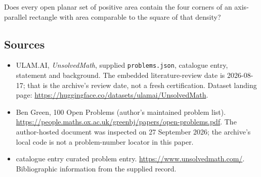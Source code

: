 \documentclass[11pt,a4paper]{article}
\begin{document}
Does every open planar set of positive area contain the four corners of an axis-parallel rectangle with area comparable to the square of that density?

\subsection{Sources}

{\small

\begin{itemize}

\item[\hypertarget{source:statement:1}{S1}] ULAM.AI, \emph{UnsolvedMath}, supplied \texttt{problems.json}, catalogue entry, statement and background. The embedded literature-review date is 2026-08-17; that is the archive’s review date, not a fresh certification. Dataset landing page: \url{https://huggingface.co/datasets/ulamai/UnsolvedMath}.

\item[\hypertarget{source:statement:2}{S2}] Ben Green, 100 Open Problems (author’s maintained problem list). \url{https://people.maths.ox.ac.uk/greenbj/papers/open-problems.pdf}. The author-hosted document was inspected on 27 September 2026; the archive’s local code is not a problem-number locator in this paper.

\item[\hypertarget{source:statement:3}{S3}] catalogue entry curated problem entry. \url{https://www.unsolvedmath.com/}. Bibliographic information from the supplied record.

\end{itemize}

}

\label{end:statement}
\end{document}
